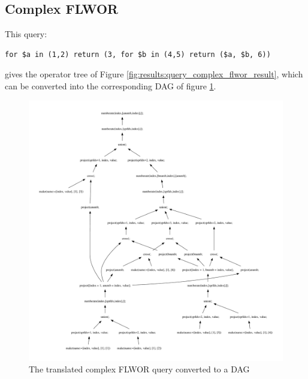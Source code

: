 \newpage
\subsection{Complex FLWOR}
\label{sect:results:algebra:generated:complex_flwor}
This query:
\begin{Verbatim}
for $a in (1,2) return (3, for $b in (4,5) return ($a, $b, 6))
\end{Verbatim}

gives the operator tree of Figure \ref{fig:results:query_complex_flwor_result}, which can be converted into the
corresponding DAG of figure \ref{fig:results:query_complex_flwor_result_dag}.





\begin{figure}[!htp]
\begin{center}
  \includegraphics[width=1.0\textwidth]{img/graphs/td_impl_flwor_complex_xq_relalg_dag}
  \caption{The translated complex FLWOR query converted to a DAG}
  \label{fig:results:query_complex_flwor_result_dag}
\end{center}
\end{figure}

